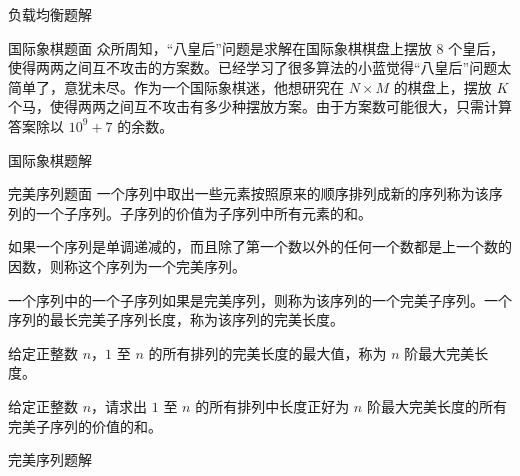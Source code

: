 \documentclass{pptt}
\begin{document}
\begin{frame}{负载均衡}{题解}
\end{frame}

\begin{frame}{国际象棋}{题面}
    众所周知，“八皇后”问题是求解在国际象棋棋盘上摆放 $8$ 个皇后，使得两两之间互不攻击的方案数。已经学习了很多算法的小蓝觉得“八皇后”问题太简单了，意犹未尽。作为一个国际象棋迷，他想研究在 $N \times M$ 的棋盘上，摆放 $K$ 个马，使得两两之间互不攻击有多少种摆放方案。由于方案数可能很大，只需计算答案除以 ${10}^9+7$ 的余数。
\end{frame}

\begin{frame}{国际象棋}{题解}
\end{frame}

\begin{frame}{完美序列}{题面}
    一个序列中取出一些元素按照原来的顺序排列成新的序列称为该序列的一个子序列。子序列的价值为子序列中所有元素的和。

    如果一个序列是单调递减的，而且除了第一个数以外的任何一个数都是上一个数的因数，则称这个序列为一个完美序列。

    一个序列中的一个子序列如果是完美序列，则称为该序列的一个完美子序列。一个序列的最长完美子序列长度，称为该序列的完美长度。

    给定正整数 $n$，$1$ 至 $n$ 的所有排列的完美长度的最大值，称为 $n$ 阶最大完美长度。

    给定正整数 $n$，请求出 $1$ 至 $n$ 的所有排列中长度正好为 $n$ 阶最大完美长度的所有完美子序列的价值的和。
\end{frame}

\begin{frame}{完美序列}{题解}
\end{frame}
\end{document}
